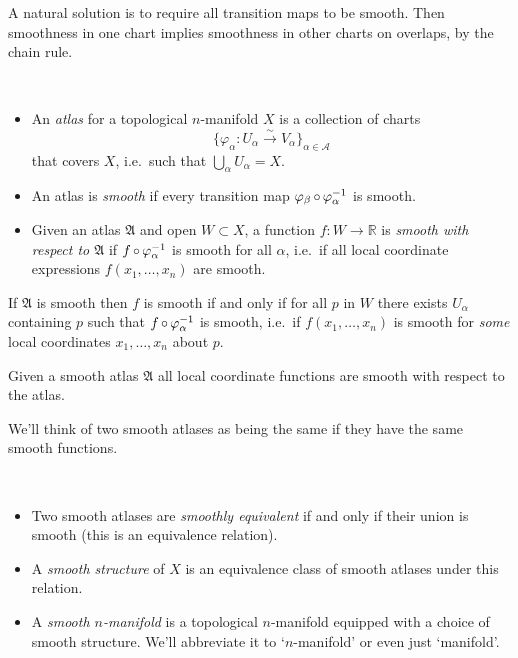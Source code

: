 \documentclass[a4paper,11pt]{article}
\begin{document}
	A natural solution is to require all transition maps to be smooth. Then smoothness in one chart implies smoothness in other charts on overlaps, by the chain rule.

	\begin{defi} \ 
		\begin{itemize}
			\item An \emph{atlas} for a topological $n$-manifold $X$ is a collection of charts \[
				\{\varphi_\alpha: U_\alpha \xrightarrow{\sim} V_\alpha\}_{\alpha\in \mathcal{A}}
			\]
			that covers $X$, i.e.\ such that $\bigcup_{\alpha} U_\alpha = X$.
			\item An atlas is \emph{smooth} if every transition map $\varphi_\beta \operatorname{\circ} \varphi_\alpha^{-1}$ is smooth.
			\item Given an atlas $\mathfrak{A}$ and open $W \subset X$, a function $f: W \to \mathbb{R}$ is \emph{smooth with respect to $\mathfrak{A}$} if $f \operatorname{\circ} \varphi_\alpha^{-1}$ is smooth for all $\alpha$, i.e.\ if all local coordinate expressions $f(x_1,\dots,x_n)$ are smooth.
		\end{itemize}
	\end{defi}

	\begin{lem}
		If $\mathfrak{A}$ is smooth then $f$ is smooth if and only if for all $p$ in $W$ there exists $U_\alpha$ containing $p$ such that $f \operatorname{\circ} \varphi_\alpha^{-1}$ is smooth, i.e.\ if $f(x_1,\dots,x_n)$ is smooth for \emph{some} local coordinates $x_1, \dots,x_n$ about $p$. 
	\end{lem}

	\begin{cor}
		Given a smooth atlas $\mathfrak{A}$ all local coordinate functions are smooth with respect to the atlas.
	\end{cor}

	We'll think of two smooth atlases as being the same if they have the same smooth functions.

	\begin{defi} \ 
		\begin{itemize}
			\item Two smooth atlases are \emph{smoothly equivalent} if and only if their union is smooth (this is an equivalence relation).
			\item A \emph{smooth structure} of $X$ is an equivalence class of smooth atlases under this relation.
			\item A \emph{smooth $n$-manifold} is a topological $n$-manifold equipped with a choice of smooth structure. We'll abbreviate it to `$n$-manifold' or even just `manifold'.
		\end{itemize}
	\end{defi}
\end{document}
